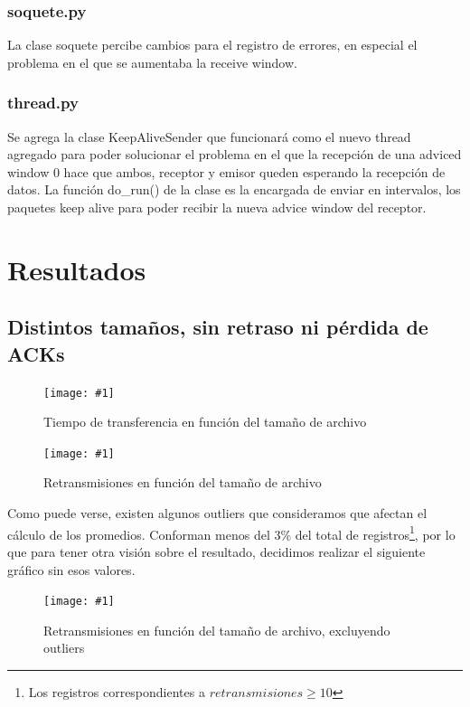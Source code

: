 \documentclass[a4paper, 10pt, twoside]{article}
\newcommand{\grafico}[3]{
  \begin{figure}[H]
    \texttt{[image: \#1]}
    \caption{#2}
    \label{#3}
  \end{figure}
}
\begin{document}
\subsubsection{soquete.py}
La clase soquete percibe cambios para el registro de errores, en especial el problema en el que se aumentaba la receive window.

\subsubsection{thread.py}
Se agrega la clase KeepAliveSender que funcionará como el nuevo thread agregado para poder solucionar el problema en el que la recepción de una adviced window 0 hace que ambos, receptor y emisor queden esperando la recepción de datos. La función do\_run() de la clase es la encargada de enviar en intervalos, los paquetes keep alive para poder recibir la nueva advice window del receptor.




\section{Resultados}
\label{sec:resultados}

\subsection{Distintos tamaños, sin retraso ni pérdida de ACKs}

\grafico{time_vs_size}
        {Tiempo de transferencia en función del tamaño de archivo}
        {plot:time_vs_size}

\grafico{retransmissions_vs_size}
        {Retransmisiones en función del tamaño de archivo}
        {plot:retransmissions_vs_size}

Como puede verse, existen algunos outliers que consideramos que afectan el cálculo de los promedios. Conforman menos del 3\% del total de registros\footnote{Los registros correspondientes a $retransmisiones \ge 10$}, por lo que para tener otra visión sobre el resultado, decidimos realizar el siguiente gráfico sin esos valores.

\grafico{retransmissions_vs_size_wo_outliers}
        {Retransmisiones en función del tamaño de archivo, excluyendo outliers}
        {plot:retransmissions_vs_size_wo_outliers}
\end{document}
